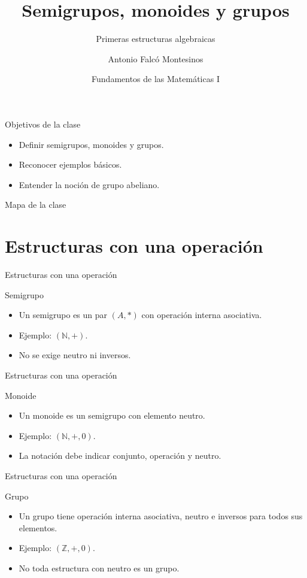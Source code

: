 \documentclass[aspectratio=169,11pt]{beamer}
\title[FdM I -- Clase 13]{Semigrupos, monoides y grupos}
\subtitle{Primeras estructuras algebraicas}
\author{Antonio Falcó Montesinos}
\institute{Universidad CEU Cardenal Herrera}
\date{Fundamentos de las Matemáticas I}
\begin{document}
\begin{frame}
  \titlepage
\end{frame}

\begin{frame}{Objetivos de la clase}
\begin{itemize}
  \item Definir semigrupos, monoides y grupos.
  \item Reconocer ejemplos básicos.
  \item Entender la noción de grupo abeliano.
\end{itemize}
\end{frame}

\begin{frame}{Mapa de la clase}
\tableofcontents
\end{frame}

\section{Estructuras con una operación}

\begin{frame}{Estructuras con una operación}
\begin{block}{Semigrupo}
\begin{itemize}
  \item Un semigrupo es un par \((A,*)\) con operación interna asociativa.
  \item Ejemplo: \((\mathbb{N},+)\).
  \item No se exige neutro ni inversos.
\end{itemize}
\end{block}
\end{frame}

\begin{frame}{Estructuras con una operación}
\begin{block}{Monoide}
\begin{itemize}
  \item Un monoide es un semigrupo con elemento neutro.
  \item Ejemplo: \((\mathbb{N},+,0)\).
  \item La notación debe indicar conjunto, operación y neutro.
\end{itemize}
\end{block}
\end{frame}

\begin{frame}{Estructuras con una operación}
\begin{block}{Grupo}
\begin{itemize}
  \item Un grupo tiene operación interna asociativa, neutro e inversos para todos sus elementos.
  \item Ejemplo: \((\mathbb{Z},+,0)\).
  \item No toda estructura con neutro es un grupo.
\end{itemize}
\end{block}
\end{frame}
\end{document}
